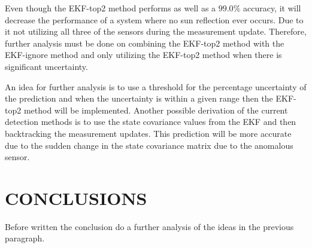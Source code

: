 \documentclass[letterpaper, 10 pt, conference]{ieeeconf}  %
\begin{document}
Even though the EKF-top2 method performs as well as a $99.0\%$ accuracy, it will decrease the performance of a system where no sun reflection ever occurs. Due to it not utilizing all three of the sensors during the measurement update. Therefore, further analysis must be done on combining the EKF-top2 method with the EKF-ignore method and only utilizing the EKF-top2 method when there is significant uncertainty. 

An idea for further analysis is to use a threshold for the percentage uncertainty of the prediction and when the uncertainty is within a given range then the EKF-top2 method will be implemented. Another possible derivation of the current detection methods is to use the state covariance values from the EKF and then backtracking the measurement updates. This prediction will be more accurate due to the sudden change in the state covariance matrix due to the anomalous sensor.

\section{CONCLUSIONS}
Before written the conclusion do a further analysis of the ideas in the previous paragraph.

\addtolength{\textheight}{-12cm}   %







\printbibliography[heading=bibintoc]




\end{document}
